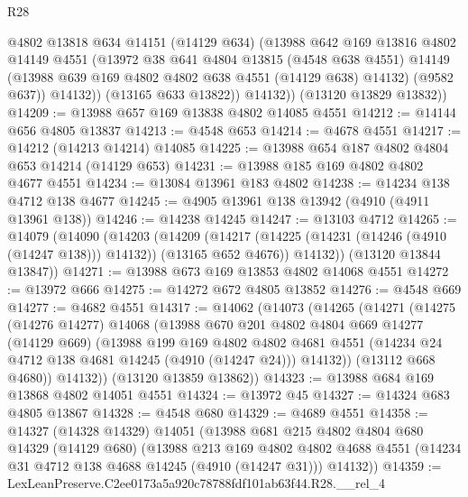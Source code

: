 \begin{lexlean}{R28}
\begin{coremodule}
              @4802
              @13818
              @634
              @14151
              (@14129 @634)
              (@13988
                @642
                @169
                @13816
                @4802
                @14149
                @4551
                (@13972
                  @38
                  @641
                  @4804
                  @13815
                  (@4548 @638 @4551)
                  @14149
                  (@13988 @639 @169 @4802 @4802 @638 @4551 (@14129 @638) @14132)
                  (@9582 @637))
                @14132))
            (@13165 @633 @13822))
          @14132))
      (@13120 @13829 @13832))
@14209 := @13988 @657 @169 @13838 @4802 @14085 @4551
@14212 := @14144 @656 @4805 @13837
@14213 := @4548 @653
@14214 := @4678 @4551
@14217 := @14212 (@14213 @14214) @14085
@14225 := @13988 @654 @187 @4802 @4804 @653 @14214 (@14129 @653)
@14231 := @13988 @185 @169 @4802 @4802 @4677 @4551
@14234 := @13084 @13961 @183 @4802
@14238 := @14234 @138 @4712 @138 @4677
@14245 := @4905 @13961 @138 @13942 (@4910 (@4911 @13961 @138))
@14246 := @14238 @14245
@14247 := @13103 @4712
@14265 := @14079
    (@14090
      (@14203
        (@14209
          (@14217 (@14225 (@14231 (@14246 (@4910 (@14247 @138))) @14132)) (@13165 @652 @4676))
          @14132))
      (@13120 @13844 @13847))
@14271 := @13988 @673 @169 @13853 @4802 @14068 @4551
@14272 := @13972 @666
@14275 := @14272 @672 @4805 @13852
@14276 := @4548 @669
@14277 := @4682 @4551
@14317 := @14062
    (@14073
      (@14265
        (@14271
          (@14275
            (@14276 @14277)
            @14068
            (@13988
              @670
              @201
              @4802
              @4804
              @669
              @14277
              (@14129 @669)
              (@13988
                @199
                @169
                @4802
                @4802
                @4681
                @4551
                (@14234 @24 @4712 @138 @4681 @14245 (@4910 (@14247 @24)))
                @14132))
            (@13112 @668 @4680))
          @14132))
      (@13120 @13859 @13862))
@14323 := @13988 @684 @169 @13868 @4802 @14051 @4551
@14324 := @13972 @45
@14327 := @14324 @683 @4805 @13867
@14328 := @4548 @680
@14329 := @4689 @4551
@14358 := @14327
    (@14328 @14329)
    @14051
    (@13988
      @681
      @215
      @4802
      @4804
      @680
      @14329
      (@14129 @680)
      (@13988
        @213
        @169
        @4802
        @4802
        @4688
        @4551
        (@14234 @31 @4712 @138 @4688 @14245 (@4910 (@14247 @31)))
        @14132))
@14359 := LexLeanPreserve.C2ee0173a5a920c78788fdf101ab63f44.R28.__rel_4

\end{coremodule}
\end{lexlean}
